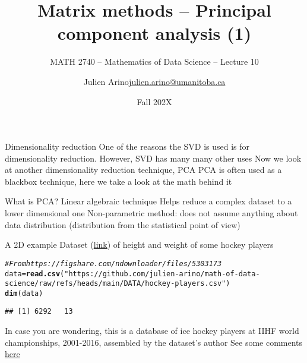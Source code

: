 \documentclass[aspectratio=169]{beamer}\usepackage[]{graphicx}\usepackage[]{xcolor}
\subtitle{MATH 2740 -- Mathematics of Data Science -- Lecture 10}
\author{\texorpdfstring{Julien Arino\newline\url{julien.arino@umanitoba.ca}}{Julien Arino}}
\institute{Department of Mathematics @ University of Manitoba}
\date{Fall 202X}
\title{Matrix methods -- Principal component analysis (1)}
\makeatletter
\newcommand{\hlsng}[1]{\textcolor[rgb]{0.192,0.494,0.8}{#1}}%
\newcommand{\hlcom}[1]{\textcolor[rgb]{0.678,0.584,0.686}{\textit{#1}}}%
\newcommand{\hldef}[1]{\textcolor[rgb]{0.345,0.345,0.345}{#1}}%
\newcommand{\hlkwb}[1]{\textcolor[rgb]{0.69,0.353,0.396}{#1}}%
\newcommand{\hlkwd}[1]{\textcolor[rgb]{0.737,0.353,0.396}{\textbf{#1}}}%
\newenvironment{kframe}{%
 \def\at@end@of@kframe{}%
 \ifinner\ifhmode%
  \def\at@end@of@kframe{\end{minipage}}%
  \begin{minipage}{\columnwidth}%
 \fi\fi%
 \def\FrameCommand##1{\hskip\@totalleftmargin \hskip-\fboxsep
 \colorbox{shadecolor}{##1}\hskip-\fboxsep
     \hskip-\linewidth \hskip-\@totalleftmargin \hskip\columnwidth}%
 \MakeFramed {\advance\hsize-\width
   \@totalleftmargin\z@ \linewidth\hsize
   \@setminipage}}%
 {\par\unskip\endMakeFramed%
 \at@end@of@kframe}
\newenvironment{knitrout}{}{} %
\makeatother
\begin{document}
\setcounter{theorem}{79}




\begin{frame}{Dimensionality reduction}
One of the reasons the SVD is used is for dimensionality reduction. However, SVD has many many other uses
\vfill
Now we look at another dimensionality reduction technique, PCA
\vfill
PCA is often used as a blackbox technique, here we take a look at the math behind it
\end{frame}


\begin{frame}{What is PCA?}
Linear algebraic technique 
\vfill
Helps reduce a complex dataset to a lower dimensional one
\vfill
Non-parametric method: does not assume anything about data distribution (distribution from the statistical point of view)
\end{frame}


\begin{frame}[fragile]{A 2D example}
Dataset (\href{https://opendata.stackexchange.com/questions/7793/age-weight-and-height-dataset}{link}) of height and weight of some hockey players
\vfill
\begin{knitrout}
\color{fgcolor}\begin{kframe}
\begin{alltt}
\hlcom{# From https://figshare.com/ndownloader/files/5303173}
\hldef{data} \hlkwb{=} \hlkwd{read.csv}\hldef{(}\hlsng{"https://github.com/julien-arino/math-of-data-science/raw/refs/heads/main/DATA/hockey-players.csv"}\hldef{)}
\hlkwd{dim}\hldef{(data)}
\end{alltt}
\begin{verbatim}
## [1] 6292   13
\end{verbatim}
\end{kframe}
\end{knitrout}
\vfill
In case you are wondering, this is a database of ice hockey players at IIHF world championships, 2001-2016, assembled by the dataset's author
\vfill
See some comments \href{https://ikashnitsky.github.io/2017/ice-hockey-players-height/}{here}
\vfill

\end{frame}
\end{document}
